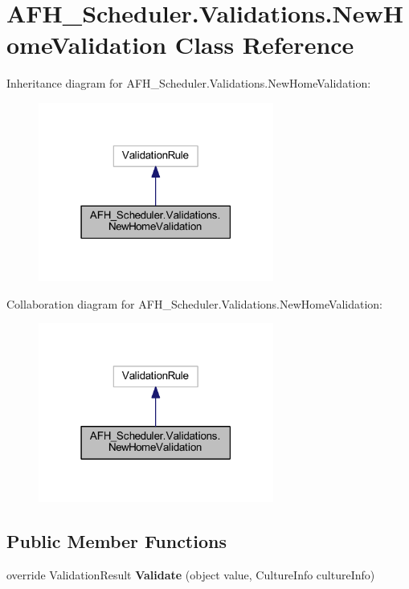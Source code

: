 \section{A\+F\+H\+\_\+\+Scheduler.\+Validations.\+New\+Home\+Validation Class Reference}
\label{class_a_f_h___scheduler_1_1_validations_1_1_new_home_validation}


Inheritance diagram for A\+F\+H\+\_\+\+Scheduler.\+Validations.\+New\+Home\+Validation\+:
\nopagebreak
\begin{figure}[H]
\begin{center}
\leavevmode
\includegraphics[width=219pt]{class_a_f_h___scheduler_1_1_validations_1_1_new_home_validation__inherit__graph}
\end{center}
\end{figure}


Collaboration diagram for A\+F\+H\+\_\+\+Scheduler.\+Validations.\+New\+Home\+Validation\+:
\nopagebreak
\begin{figure}[H]
\begin{center}
\leavevmode
\includegraphics[width=219pt]{class_a_f_h___scheduler_1_1_validations_1_1_new_home_validation__coll__graph}
\end{center}
\end{figure}
\subsection*{Public Member Functions}
\begin{DoxyCompactItemize}
\item 
override Validation\+Result \textbf{ Validate} (object value, Culture\+Info culture\+Info)
\end{DoxyCompactItemize}
